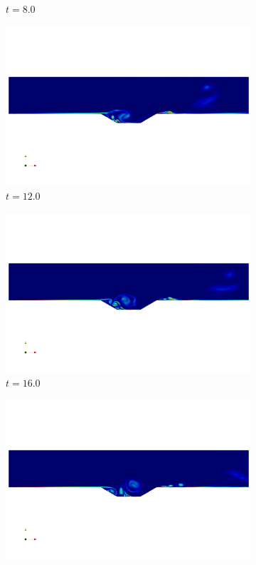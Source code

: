 \begin{figure}
\begin{center}
\begin{subfigure}[t]{0.49\textwidth}
\caption{$t=8.0$}
\end{subfigure}
\begin{subfigure}[t]{0.49\textwidth}
\includegraphics[trim={18cm 16cm 18cm 15cm},clip,width=1.0\linewidth]{figs/cavity/animate/sol0120.png}
\caption{$t=12.0$}
\end{subfigure}
\begin{subfigure}[t]{0.49\textwidth}
\includegraphics[trim={18cm 16cm 18cm 15cm},clip,width=1.0\linewidth]{figs/cavity/animate/sol0160.png}
\caption{$t=16.0$}
\end{subfigure}
\begin{subfigure}[t]{0.49\textwidth}
\includegraphics[trim={18cm 16cm 18cm 15cm},clip,width=1.0\linewidth]{figs/cavity/animate/sol0200.png}

\end{subfigure}
\end{center}
\end{figure}
